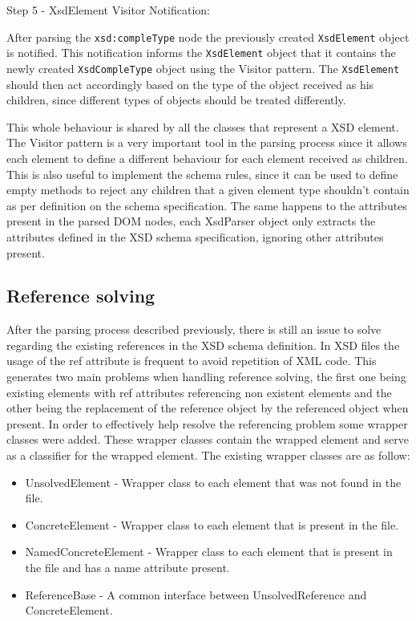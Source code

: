 Step 5 - XsdElement Visitor Notification:

\noindent
After parsing the \texttt{xsd:compleType} node the previously created \texttt{XsdElement} object is notified. This notification informs the \texttt{XsdElement} object that it contains the newly created \texttt{XsdCompleType} object using the Visitor pattern. The \texttt{XsdElement} should then act accordingly based on the type of the object received as his children, since different types of objects should be treated differently. 

\noindent
This whole behaviour is shared by all the classes that represent a \ac{XSD} element. The Visitor pattern is a very important tool in the parsing process since it allows each element to define a different behaviour for each element received as children. This is also useful to implement the schema rules, since it can be used to define empty methods to reject any children that a given element type shouldn't contain as per definition on the schema specification. The same happens to the attributes present in the parsed \ac{DOM} nodes, each XsdParser object only extracts the attributes defined in the \ac{XSD} schema specification, ignoring other attributes present.

\subsection{Reference solving}
\label{sec:refsolving}

After the parsing process described previously, there is still an issue to solve regarding the existing references in the \ac{XSD} schema definition. In \ac{XSD} files the usage of the ref attribute is frequent to avoid repetition of \ac{XML} code. This generates two main problems when handling reference solving, the first one being existing elements with ref attributes referencing non existent elements and the other being the replacement of the reference object by the referenced object when present. In order to effectively help resolve the referencing problem some wrapper classes were added. These wrapper classes contain the wrapped element and serve as a classifier for the wrapped element. The existing wrapper classes are as follow:

\begin{itemize}  
	\item UnsolvedElement - Wrapper class to each element that was not found in the file.
	\item ConcreteElement - Wrapper class to each element that is present in the file.
	\item NamedConcreteElement - Wrapper class to each element that is present in the file and has a name attribute present.
	\item ReferenceBase - A common interface between UnsolvedReference and ConcreteElement.
\end{itemize}

